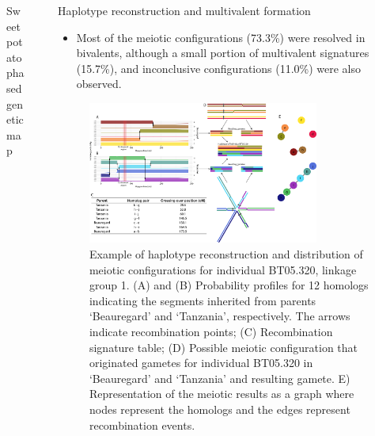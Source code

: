 \documentclass[final, 13pt]{beamer}
\newlength{\sepwid}
\newlength{\twocolwid}
\begin{document}
\begin{frame}[t]
\begin{columns}[t]
\begin{column}{\twocolwid}
\begin{block}{Sweetpotato phased genetic map}
\begin{figure}[htp]
  \end{figure} 
  \end{block}
  \end{column} %

\begin{column}{\sepwid}\end{column} %

\begin{column}{\twocolwid} %
\begin{block}{Haplotype reconstruction and multivalent formation}
    
\begin{itemize}
\item Most of the meiotic configurations (73.3\%) were resolved in bivalents, although a small portion of multivalent signatures (15.7\%), and inconclusive configurations (11.0\%) were also observed.
\end{itemize}    
    
    
 \begin{figure}[htp]
      \centering
      \includegraphics[width=0.8\textwidth]{figures/haplotype_reconstruction.png}
      \caption{\hspace{.01cm} Example of haplotype reconstruction and distribution of meiotic configurations for individual BT05.320, linkage group 1. (A) and (B) Probability profiles for 12 homologs indicating the segments inherited from parents ‘Beauregard’ and ‘Tanzania’, respectively.  The arrows indicate recombination points; (C) Recombination signature table; (D) Possible meiotic configuration that originated gametes for individual BT05.320 in ‘Beauregard’ and ‘Tanzania’ and resulting gamete. E) Representation of the meiotic results as a graph where nodes represent the homologs and the edges represent recombination events.} 
    \end{figure}  
\end{block}


\end{column}
\end{columns}
\end{frame}
\end{document}
